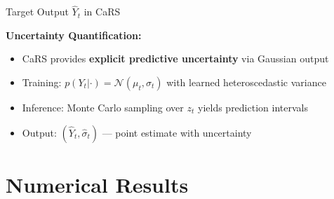 \documentclass[aspectratio=169]{beamer}
\begin{document}
\begin{frame}{Target Output $\hat{Y}_t$ in CaRS}
\vspace{0.3cm}
\begin{center}
\end{center}

\vspace{0.3cm}
\textbf{Uncertainty Quantification:}
\begin{itemize}
    \item CaRS provides \textbf{explicit predictive uncertainty} via Gaussian output
    \item Training: $p(Y_t | \cdot) = \mathcal{N}(\mu_t, \sigma_t)$ with learned heteroscedastic variance
    \item Inference: Monte Carlo sampling over $z_t$ yields prediction intervals
    \item Output: $(\hat{Y}_t, \hat{\sigma}_t)$ --- point estimate with uncertainty
\end{itemize}
\end{frame}

\section{Numerical Results}
\end{document}
